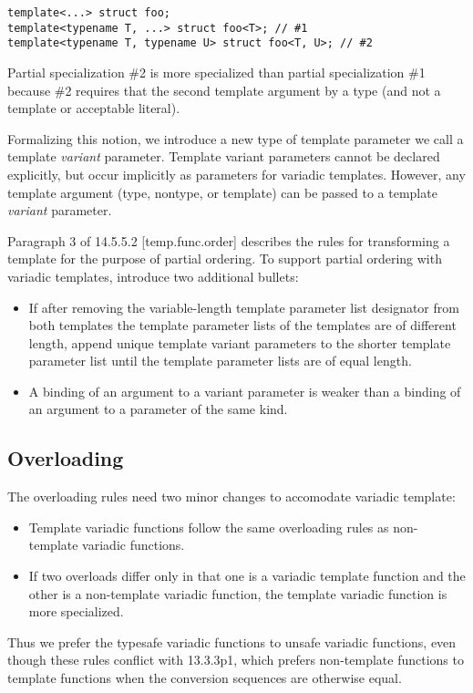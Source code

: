 \documentclass{article}
\begin{document}
\begin{verbatim}
template<...> struct foo;
template<typename T, ...> struct foo<T>; // #1
template<typename T, typename U> struct foo<T, U>; // #2
\end{verbatim}

Partial specialization \#2 is more specialized than partial
specialization \#1 because \#2 requires that the second template
argument by a type (and not a template or acceptable
literal). 

Formalizing this notion, we introduce a new type of template
parameter we call a template {\em variant} parameter. Template variant
parameters cannot be declared explicitly, but occur implicitly as
parameters for variadic templates. However, any template argument
(type, nontype, or template) can be passed to a template {\em variant}
parameter. 

Paragraph 3 of 14.5.5.2 [temp.func.order] describes the rules for
transforming a template for the purpose of partial ordering. To
support partial ordering with variadic templates, introduce two
additional bullets:
\begin{itemize}
\item If after removing the variable-length template parameter list
  designator from both templates the template parameter lists of the
  templates are of different length, append unique template variant
  parameters to the shorter template parameter list until the template
  parameter lists are of equal length.
\item A binding of an argument to a variant parameter is weaker than a
  binding of an argument to a parameter of the same kind.
\end{itemize}

\subsection{Overloading}
\label{overloading}
The overloading rules need two minor changes to accomodate variadic template:
\begin{itemize}
\item Template variadic functions follow the same overloading rules as
  non-template variadic functions.
\item If two overloads differ only in that one is a variadic template
  function and the other is a non-template variadic function, the
  template variadic function is more specialized.
\end{itemize}

Thus we prefer the typesafe variadic functions to unsafe variadic
functions, even though these rules conflict with 13.3.3p1, which
prefers non-template functions to template functions when the
conversion sequences are otherwise equal.
\end{document}
